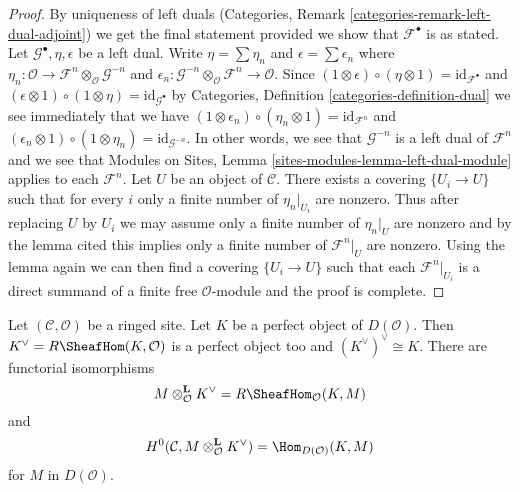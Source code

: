 \begin{proof}
By uniqueness of left duals
(Categories, Remark \ref{categories-remark-left-dual-adjoint})
we get the final statement provided we show that $\mathcal{F}^\bullet$
is as stated. Let $\mathcal{G}^\bullet, \eta, \epsilon$ be a left dual.
Write $\eta = \sum \eta_n$ and $\epsilon = \sum \epsilon_n$
where $\eta_n : \mathcal{O} \to
\mathcal{F}^n \otimes_\mathcal{O} \mathcal{G}^{-n}$
and
$\epsilon_n : \mathcal{G}^{-n} \otimes_\mathcal{O} \mathcal{F}^n
\to \mathcal{O}$. Since
$(1 \otimes \epsilon) \circ (\eta \otimes 1) = \text{id}_{\mathcal{F}^\bullet}$
and
$(\epsilon \otimes 1) \circ (1 \otimes \eta) = \text{id}_{\mathcal{G}^\bullet}$
by Categories, Definition \ref{categories-definition-dual} we see immediately
that we have
$(1 \otimes \epsilon_n) \circ (\eta_n \otimes 1) = \text{id}_{\mathcal{F}^n}$
and
$(\epsilon_n \otimes 1) \circ (1 \otimes \eta_n) =
\text{id}_{\mathcal{G}^{-n}}$.
In other words, we see that $\mathcal{G}^{-n}$ is a left dual of
$\mathcal{F}^n$ and we see that
Modules on Sites, Lemma \ref{sites-modules-lemma-left-dual-module}
applies to each $\mathcal{F}^n$. Let $U$ be an object of $\mathcal{C}$.
There exists a covering $\{U_i \to U\}$ such that for every
$i$ only a finite number of $\eta_n|_{U_i}$ are nonzero.
Thus after replacing $U$ by $U_i$ we may assume only a finite
number of $\eta_n|_U$ are nonzero and by the lemma cited
this implies only a finite number of $\mathcal{F}^n|_U$ are 
nonzero. Using the lemma again we can then find a covering
$\{U_i \to U\}$ such that each
$\mathcal{F}^n|_{U_i}$ is a direct summand of a finite
free $\mathcal{O}$-module and the proof is complete.
\end{proof}

\begin{lemma}
\label{lemma-dual-perfect-complex}
Let $(\mathcal{C}, \mathcal{O})$ be a ringed site.
Let $K$ be a perfect object of $D(\mathcal{O})$.
Then $K^\vee = R\SheafHom(K, \mathcal{O})$ is a
perfect object too and $(K^\vee)^\vee \cong K$. There are
functorial isomorphisms
$$
M \otimes^\mathbf{L}_\mathcal{O} K^\vee = R\SheafHom_\mathcal{O}(K, M)
$$
and
$$
H^0(\mathcal{C}, M \otimes^\mathbf{L}_\mathcal{O} K^\vee) =
\Hom_{D(\mathcal{O})}(K, M)
$$
for $M$ in $D(\mathcal{O})$.
\end{lemma}


